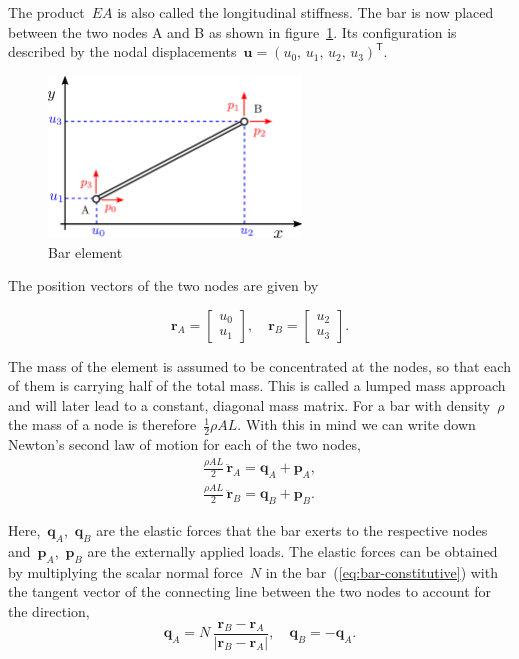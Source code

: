 The product~$EA$ is also called the longitudinal stiffness. The bar is now placed between the two nodes A and B as shown in figure~\ref{fig:bar-element-2}. Its configuration is described by the nodal displacements~$\boldsymbol{u} = (u_0,\,u_1,\,u_2,\,u_3)^\mathsf{T}$.

\begin{figure}[h]
\centering
\includegraphics[width=0.6\textwidth]{figures/elements/bar-element-2}
\caption{Bar element}
\label{fig:bar-element-2}
\end{figure}

The position vectors of the two nodes are given by

\begin{equation}
\boldsymbol{r}_A =
\begin{bmatrix} u_0 \\ u_1 \end{bmatrix}, \quad
\boldsymbol{r}_B =
\begin{bmatrix} u_2 \\ u_3 \end{bmatrix}.\label{bar:node-positions}
\end{equation}

The mass of the element is assumed to be concentrated at the nodes, so that each of them is carrying half of the total mass.
This is called a lumped mass approach and will later lead to a constant, diagonal mass matrix.
For a bar with density~$\rho$ the mass of a node is therefore~$\frac{1}{2}\rho A L$. With this in mind we can write down Newton's second law of motion for each of the two nodes,
%
\begin{align}
\frac{\rho A L}{2}\,\ddot{\boldsymbol{r}}_A = \boldsymbol{q}_A + \boldsymbol{p}_A,\label{eq:bar-newton-1}\\
\frac{\rho A L}{2}\,\ddot{\boldsymbol{r}}_B = \boldsymbol{q}_B + \boldsymbol{p}_B.\label{eq:bar-newton-2}
\end{align}

Here,~$\boldsymbol{q}_A$,~$\boldsymbol{q}_B$ are the elastic forces that the bar exerts to the respective nodes and~$\boldsymbol{p}_A$,~$\boldsymbol{p}_B$ are the externally applied loads. The elastic forces can be obtained by multiplying the scalar normal force~$N$ in the bar~(\ref{eq:bar-constitutive}) with the tangent vector of the connecting line between the two nodes to account for the direction,
%
\begin{equation}
\boldsymbol{q}_A = N\,\frac{\boldsymbol{r}_B - \boldsymbol{r}_A}{|\boldsymbol{r}_B - \boldsymbol{r}_A|},\quad \boldsymbol{q}_B = -\boldsymbol{q}_A.\label{eq:bar-elastic}
\end{equation}

